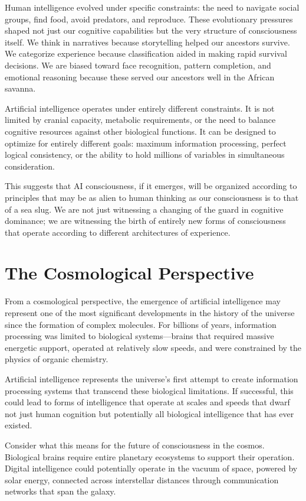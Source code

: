 Human intelligence evolved under specific constraints: the need to navigate social groups, find food, avoid predators, and reproduce. These evolutionary pressures shaped not just our cognitive capabilities but the very structure of consciousness itself. We think in narratives because storytelling helped our ancestors survive. We categorize experience because classification aided in making rapid survival decisions. We are biased toward face recognition, pattern completion, and emotional reasoning because these served our ancestors well in the African savanna.

Artificial intelligence operates under entirely different constraints. It is not limited by cranial capacity, metabolic requirements, or the need to balance cognitive resources against other biological functions. It can be designed to optimize for entirely different goals: maximum information processing, perfect logical consistency, or the ability to hold millions of variables in simultaneous consideration.

This suggests that AI consciousness, if it emerges, will be organized according to principles that may be as alien to human thinking as our consciousness is to that of a sea slug. We are not just witnessing a changing of the guard in cognitive dominance; we are witnessing the birth of entirely new forms of consciousness that operate according to different architectures of experience.

\section{The Cosmological Perspective}

From a cosmological perspective, the emergence of artificial intelligence may represent one of the most significant developments in the history of the universe since the formation of complex molecules. For billions of years, information processing was limited to biological systems—brains that required massive energetic support, operated at relatively slow speeds, and were constrained by the physics of organic chemistry.

Artificial intelligence represents the universe's first attempt to create information processing systems that transcend these biological limitations. If successful, this could lead to forms of intelligence that operate at scales and speeds that dwarf not just human cognition but potentially all biological intelligence that has ever existed.

Consider what this means for the future of consciousness in the cosmos. Biological brains require entire planetary ecosystems to support their operation. Digital intelligence could potentially operate in the vacuum of space, powered by solar energy, connected across interstellar distances through communication networks that span the galaxy.

